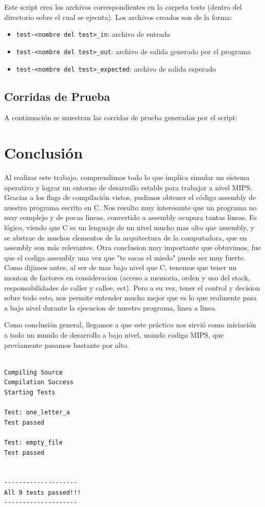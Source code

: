 \documentclass[11pt,a4paper]{article}
\begin{document}
Este script crea los archivos correspondientes en la carpeta tests (dentro del directorio sobre el cual se ejecuta).
Los archivos creados son de la forma:

\begin{itemize}
	\item \texttt{test-<nombre del test>\_in}: archivo de entrada
	\item \texttt{test-<nombre del test>\_out}: archivo de salida generado por el programa
	\item \texttt{test-<nombre del test>\_expected}: archivo de salida esperado
\end{itemize}

\subsection{Corridas de Prueba}
A continuación se muestran las corridas de prueba generadas por el script:

\section{Conclusión}
Al realizar este trabajo, comprendimos todo lo que implica simular un sistema operativo y lograr un entorno de desarrollo estable para trabajar a nivel MIPS.
Gracias a  los flags de compilación vistos, pudimos obtener el código assembly de nuestro programa escrito en C. Nos resulto muy interesante que un programa no muy complejo y de pocas lineas, convertido a assembly ocupara tantas lineas. Es lógico, viendo que C es un lenguaje de un nivel mucho mas alto que assembly, y se abstrae de muchos elementos de la arquitectura de la computadora, que en assembly son más relevantes.
Otra conclusion muy importante que obtuvimos, fue que el codigo assembly una vez que "te sacas el miedo" puede ser muy fuerte. Como dijimos antes, al ser de mas bajo nivel que C, tenemos que tener un monton de factores en consideracion (acceso a memoria, orden y uso del stack, responsabilidades de caller y callee, ect). Pero a su vez, tener el control y decision sobre todo esto, nos permite entender mucho mejor que es lo que realmente pasa a bajo nivel durante la ejecucion de nuestro programa, linea a linea.

Como conclusión general, llegamos a que este práctico nos sirvió como iniciación a todo un mundo de desarrollo a bajo nivel, usando codigo MIPS, que previamente pasamos bastante por alto.

\begin{lstlisting}

Compiling Source
Compilation Success
Starting Tests

Test: one_letter_a
Test passed

Test: empty_file
Test passed


--------------------
All 9 tests passed!!!
--------------------
\end{lstlisting}
\end{document}
